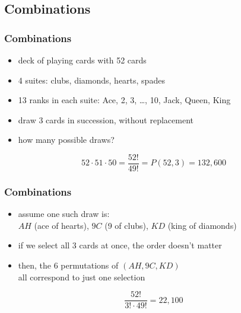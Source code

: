 \documentclass[dvipsnames]{beamer}
\begin{document}
\subsection{Combinations}

\begin{frame}
  \frametitle{Combinations}

  \begin{example}
    \begin{itemize}
      \item deck of playing cards with 52 cards
      \item 4 suites: clubs, diamonds, hearts, spades
      \item 13 ranks in each suite: Ace, 2, 3, \ldots, 10, Jack, Queen, King
      \item draw 3 cards in succession, without replacement
      \item how many possible draws?
    \end{itemize}

    \pause
    \begin{equation*}
      52 \cdot 51 \cdot 50 = \frac{52!}{49!} = P(52,3) = 132,600
    \end{equation*}  
  \end{example}
\end{frame}

\begin{frame}
  \frametitle{Combinations}

  \begin{example}
    \begin{itemize}
      \item assume one such draw is:\\
        $AH$ (ace of hearts), $9C$ (9 of clubs), $KD$ (king of diamonds)
      \item if we select all 3 cards at once, the order doesn't matter
      \item then, the 6 permutations of $(AH,9C,KD)$\\
        all correspond to just one selection
    \end{itemize}
    \begin{equation*}
      \frac{52!}{3! \cdot 49!} = 22,100
    \end{equation*}  
  \end{example}
\end{frame}
\end{document}
